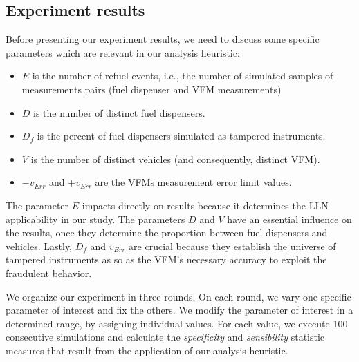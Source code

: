 \documentclass[sigplan]{acmart}
\begin{document}

\subsection{Experiment results}
Before presenting our experiment results, we need to discuss some specific parameters which are relevant in our analysis heuristic:
\begin{itemize}
    \item $E$ is the number of refuel events, i.e., the number of simulated samples of measurements pairs (fuel dispenser and VFM measurements)
    \item $D$ is the number of distinct fuel dispensers.
    \item $D_f$ is the percent of fuel dispensers simulated as tampered instruments.
    \item $V$ is the number of distinct vehicles (and consequently, distinct VFM).
    \item $-v_{Err}$ and $+v_{Err}$ are the VFMs measurement error limit values.
\end{itemize}

The parameter $E$ impacts directly on results because it determines the LLN applicability in our study.
The parameters $D$ and $V$ have an essential influence on the results, once they determine the proportion between fuel dispensers and vehicles.
Lastly, $D_f$ and $v_{Err}$ are crucial because they establish the universe of tampered instruments as so as the VFM's necessary accuracy to exploit the fraudulent behavior.

We organize our experiment in three rounds.
On each round, we vary one specific parameter of interest and fix the others.
We modify the parameter of interest in a determined range, by assigning individual values.
For each value, we execute 100 consecutive simulations and calculate the \emph{specificity} and \emph{sensibility} statistic measures that result from the application of our analysis heuristic.
\end{document}
